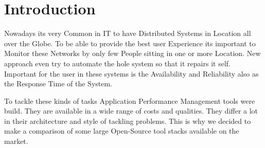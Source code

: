 
\chapter{Introduction}
Nowadays its very Common in IT to have Distributed Systems in Location all over the Globe. To be able to provide the best user Experience its important to Monitor these Networks by only few People sitting in one or more Location. New approach even try to automate the hole system so that it repairs it self. Important for the user in these systems is the Availability and Reliability also as the Response Time of the System. 

To tackle these kinds of tasks Application Performance Management tools were build. They are available in a wide range of costs and qualities. They differ a lot in their architecture and style of tackling problems. This is why we decided to make a comparison of some large Open-Source tool stacks available on the market. 


